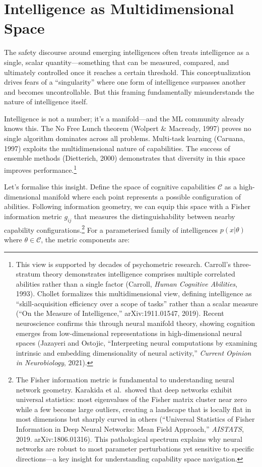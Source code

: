 \section{Intelligence as Multidimensional Space}\label{sec:intelligence-as-multidimensional-space}

The safety discourse around emerging intelligences often treats intelligence as a single, scalar quantity---something that can be measured, compared, and ultimately controlled once it reaches a certain threshold.
This conceptualization drives fears of a ``singularity'' where one form of intelligence surpasses another and becomes uncontrollable.
But this framing fundamentally misunderstands the nature of intelligence itself.

Intelligence is not a number; it's a manifold---and the ML community already knows this.
The No Free Lunch theorem (Wolpert \& Macready, 1997) proves no single algorithm dominates across all problems.
Multi-task learning (Caruana, 1997) exploits the multidimensional nature of capabilities.
The success of ensemble methods (Dietterich, 2000) demonstrates that diversity in this space improves performance.\footnote{This view is supported by decades of psychometric research. Carroll's three-stratum theory demonstrates intelligence comprises multiple correlated abilities rather than a single factor (Carroll, \textit{Human Cognitive Abilities}, 1993). Chollet formalizes this multidimensional view, defining intelligence as ``skill-acquisition efficiency over a scope of tasks'' rather than a scalar measure (``On the Measure of Intelligence,'' arXiv:1911.01547, 2019). Recent neuroscience confirms this through neural manifold theory, showing cognition emerges from low-dimensional representations in high-dimensional neural spaces (Jazayeri and Ostojic, ``Interpreting neural computations by examining intrinsic and embedding dimensionality of neural activity,'' \textit{Current Opinion in Neurobiology}, 2021).}

Let's formalise this insight. Define the space of cognitive capabilities $\mathcal{C}$ as a high-dimensional manifold where each point represents a possible configuration of abilities. Following information geometry, we can equip this space with a Fisher information metric $g_{ij}$ that measures the distinguishability between nearby capability configurations.\footnote{The Fisher information metric is fundamental to understanding neural network geometry. Karakida et al.\ showed that deep networks exhibit universal statistics: most eigenvalues of the Fisher matrix cluster near zero while a few become large outliers, creating a landscape that is locally flat in most dimensions but sharply curved in others (``Universal Statistics of Fisher Information in Deep Neural Networks: Mean Field Approach,'' \textit{AISTATS}, 2019. arXiv:1806.01316). This pathological spectrum explains why neural networks are robust to most parameter perturbations yet sensitive to specific directions---a key insight for understanding capability space navigation.} For a parameterised family of intelligences $p(x|\theta)$ where $\theta \in \mathcal{C}$, the metric components are:

